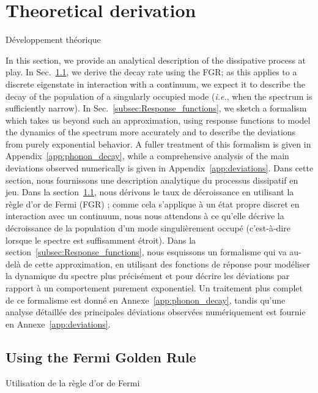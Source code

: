 \documentclass[aps,prd,notitlepage,amsfonts,amssymb,amsmath,nofootinbib,superscriptaddress,longbibliography]{revtex4-2}
\newcommand{\trad}[1]{\textcolor{tradcolor}{#1}}
\begin{document}

\section{Theoretical derivation}
\label{sec:Theory}
\trad{Développement théorique
}

In this section, we provide an analytical description of the dissipative process at play.  In Sec.~\ref{subsec:FGR}, we derive the decay rate using the FGR; as this applies to a discrete eigenstate in interaction with a continuum, we expect it to describe the decay of the population of a singularly occupied mode ({\it i.e.}, when the spectrum is sufficiently narrow).  In Sec.~\ref{subsec:Response_functions}, we sketch a formalism which takes us beyond such an approximation, using response functions to model the dynamics of the spectrum more accurately and to describe the deviations from purely exponential behavior.  A fuller treatment of this formalism is given in Appendix~\ref{app:phonon_decay}, while a comprehensive analysis of the main deviations observed numerically is given in Appendix~\ref{app:deviations}.
\trad{
Dans cette section, nous fournissons une description analytique du processus dissipatif en jeu. Dans la section~\ref{subsec:FGR}, nous dérivons le taux de décroissance en utilisant la règle d'or de Fermi (FGR) ; comme cela s'applique à un état propre discret en interaction avec un continuum, nous nous attendons à ce qu'elle décrive la décroissance de la population d'un mode singulièrement occupé (c'est-à-dire lorsque le spectre est suffisamment étroit). Dans la section~\ref{subsec:Response_functions}, nous esquissons un formalisme qui va au-delà de cette approximation, en utilisant des fonctions de réponse pour modéliser la dynamique du spectre plus précisément et pour décrire les déviations par rapport à un comportement purement exponentiel. Un traitement plus complet de ce formalisme est donné en Annexe~\ref{app:phonon_decay}, tandis qu'une analyse détaillée des principales déviations observées numériquement est fournie en Annexe~\ref{app:deviations}.
}



\subsection{Using the Fermi Golden Rule}
\label{subsec:FGR}
\trad{Utilisation de la règle d'or de Fermi}
\end{document}
